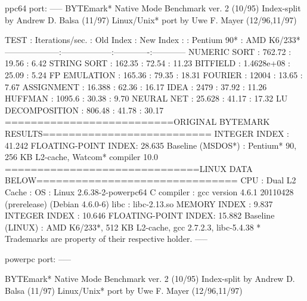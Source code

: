 \documentclass[mingoth,a4paper]{jsarticle}
\begin{document}
\begin{commandline}
ppc64 port:
-----
BYTEmark* Native Mode Benchmark ver. 2 (10/95)
Index-split by Andrew D. Balsa (11/97)
Linux/Unix* port by Uwe F. Mayer (12/96,11/97)

TEST                : Iterations/sec.  : Old Index   : New Index
                    :                  : Pentium 90* : AMD K6/233*
--------------------:------------------:-------------:------------
NUMERIC SORT        :          762.72  :      19.56  :       6.42
STRING SORT         :          162.35  :      72.54  :      11.23
BITFIELD            :      1.4628e+08  :      25.09  :       5.24
FP EMULATION        :          165.36  :      79.35  :      18.31
FOURIER             :           12004  :      13.65  :       7.67
ASSIGNMENT          :          16.388  :      62.36  :      16.17
IDEA                :            2479  :      37.92  :      11.26
HUFFMAN             :          1095.6  :      30.38  :       9.70
NEURAL NET          :          25.628  :      41.17  :      17.32
LU DECOMPOSITION    :          806.48  :      41.78  :      30.17
==========================ORIGINAL BYTEMARK RESULTS==========================
INTEGER INDEX       : 41.242
FLOATING-POINT INDEX: 28.635
Baseline (MSDOS*)   : Pentium* 90, 256 KB L2-cache, Watcom* compiler 10.0
==============================LINUX DATA BELOW===============================
CPU                 : Dual
L2 Cache            : 
OS                  : Linux 2.6.38-2-powerpc64
C compiler          : gcc version 4.6.1 20110428 (prerelease) (Debian 4.6.0-6) 
libc                : libc-2.13.so
MEMORY INDEX        : 9.837
INTEGER INDEX       : 10.646
FLOATING-POINT INDEX: 15.882
Baseline (LINUX)    : AMD K6/233*, 512 KB L2-cache, gcc 2.7.2.3, libc-5.4.38
* Trademarks are property of their respective holder.
-----

powerpc port:
-----

BYTEmark* Native Mode Benchmark ver. 2 (10/95)
Index-split by Andrew D. Balsa (11/97)
Linux/Unix* port by Uwe F. Mayer (12/96,11/97)


\end{commandline}
\end{document}
